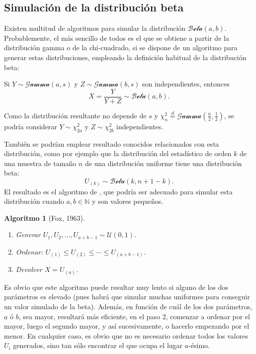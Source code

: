\documentclass[
  10pt,
]{book}
\theoremstyle{break}
\newtheorem{conjecture}{Algoritmo}[chapter]
\theoremstyle{nonumberplain}
\begin{document}
\hypertarget{simulaciuxf3n-de-la-distribuciuxf3n-beta}{%
\subsection{Simulación de la distribución beta}\label{simulaciuxf3n-de-la-distribuciuxf3n-beta}}

Existen multitud de algoritmos para simular la distribución \(\mathcal{Beta}(a, b)\).
Probablemente, el más sencillo de todos es el que se obtiene a partir de la distribución gamma o de la chi-cuadrado, si se dispone de un algoritmo para generar estas distribuciones, empleando la definición habitual de la distribución beta:

Si \(Y \sim \mathcal{Gamma}(a, s)\) y \(Z \sim \mathcal{Gamma}(b, s)\) son independientes, entonces \[X=\frac{Y}{Y+Z} \sim \mathcal{Beta}(a, b).\]

Como la distribución resultante no depende de \(s\) y \(\chi^2_{n} \overset{d}{=} \mathcal{Gamma}\left(\tfrac{n}{2}, \tfrac{1}{2}\right)\), se podría considerar \(Y \sim \chi^2_{2a}\) y \(Z \sim \chi^2_{2b}\) independientes.

También se podrían emplear resultado conocidos relacionados con esta distribución, como por ejemplo que la distribución del estadístico de orden \(k\) de una muestra de tamaño \(n\) de una distribución uniforme tiene una distribución beta:
\[U_{(k)} \sim \mathcal{Beta}(k,n+1-k).\]
El resultado es el algoritmo de \citet{fox1963}, que podría ser adecuado para simular esta distribución cuando \(a, b \in \mathbb{N}\) y son valores pequeños.

\begin{conjecture}[Fox, 1963]
\protect\hypertarget{cnj:fox}{}\label{cnj:fox}

\begin{enumerate}
\def\labelenumi{\arabic{enumi}.}
\item
  Generar \(U_1, U_2, \ldots, U_{a+b-1} \sim \mathcal{U}(0, 1)\).
\item
  Ordenar: \(U_{(1)}\leq U_{(2)}\leq\cdots\leq U_{(a+b-1)}\).
\item
  Devolver \(X=U_{(a)}\).
\end{enumerate}

\end{conjecture}

Es obvio que este algoritmo puede resultar muy lento si alguno de los dos parámetros es elevado (pues habrá que simular muchas uniformes para conseguir un valor simulado de la beta).
Además, en función de cuál de los dos parámetros, \(a\) ó \(b\), sea mayor, resultará más eficiente, en el paso 2, comenzar a ordenar por el mayor, luego el segundo mayor, y así sucesivamente, o hacerlo empezando por el menor.
En cualquier caso, es obvio que no es necesario ordenar todos los valores \(U_{i}\) generados, sino tan sólo encontrar el que ocupa el lugar \(a\)-ésimo.
\end{document}

